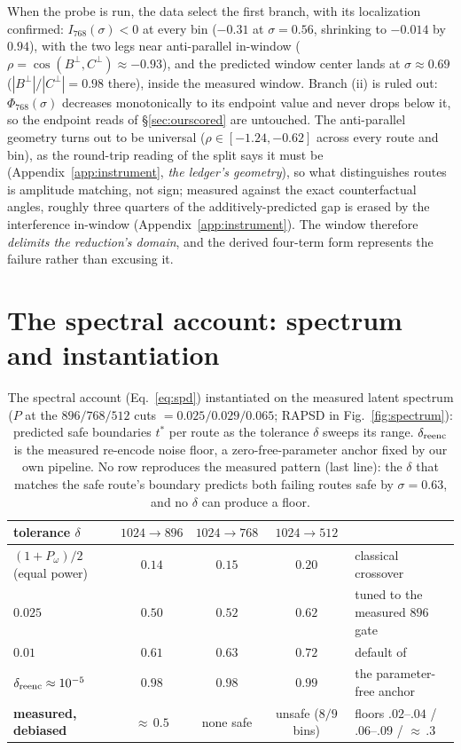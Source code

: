 When the probe is run, the data select the first branch, with its
localization confirmed:
$I_{768}(\sigma) < 0$ at every bin ($-0.31$ at $\sigma = 0.56$,
shrinking to $-0.014$ by $0.94$), with the two legs near anti-parallel
in-window ($\rho = \cos(B^{\perp}, C^{\perp}) \approx -0.93$), and the
predicted window center lands at $\sigma \approx 0.69$
($|B^{\perp}|/|C^{\perp}| = 0.98$ there), inside the measured
window. Branch (ii) is ruled out: $\Phi_{768}(\sigma)$ decreases
monotonically to its endpoint value and never drops below it, so the
endpoint reads of \S\ref{sec:ourscored} are untouched. The
anti-parallel geometry turns out to be universal
($\rho \in [-1.24, -0.62]$ across every route and bin), as the
round-trip reading of the split says it must be
(Appendix~\ref{app:instrument}, \emph{the ledger's geometry}), so what
distinguishes routes is amplitude matching, not sign; measured against
the exact counterfactual angles, roughly three quarters of the
additively-predicted gap is erased by the interference in-window
(Appendix~\ref{app:instrument}). The window therefore \emph{delimits
the reduction's domain}, and the derived four-term form represents the
failure rather than excusing it.

\section{The spectral account: spectrum and instantiation}
\label{app:spectral}

\begin{table}[t]
\caption{The spectral account (Eq.~\ref{eq:spd}) instantiated on the
measured latent spectrum ($P$ at the $896/768/512$ cuts
$= 0.025/0.029/0.065$; RAPSD in Fig.~\ref{fig:spectrum}):
predicted safe boundaries $t^{*}$ per route as the tolerance $\delta$
sweeps its range. $\delta_{\mathrm{reenc}}$ is the measured re-encode noise
floor, a zero-free-parameter anchor fixed by our own pipeline. No row
reproduces the measured pattern (last line): the $\delta$ that matches
the safe route's boundary predicts both failing routes safe by
$\sigma = 0.63$, and no $\delta$ can produce a floor.}
\label{tab:null}
\centering
\small
\setlength{\tabcolsep}{4pt}
\begin{tabular}{lcccl}
\toprule
tolerance $\delta$ & $1024{\to}896$ & $1024{\to}768$ & $1024{\to}512$ & \\
\midrule
$(1+P_\omega)/2$ (equal power) & $0.14$ & $0.15$ & $0.20$ & classical crossover \\
$0.025$ & $0.50$ & $0.52$ & $0.62$ & tuned to the measured $896$ gate \\
$0.01$ & $0.61$ & $0.63$ & $0.72$ & default of \citet{xiao2026spd} \\
$\delta_{\mathrm{reenc}} \approx 10^{-5}$ & $0.98$ & $0.98$ & $0.99$ & the parameter-free anchor \\
\midrule
\textbf{measured, debiased} & ${\approx}\,0.5$ &
none safe & unsafe ($8/9$ bins) & floors $.02$--$.04$ / $.06$--$.09$ / ${\approx}\,.3$ \\
\bottomrule
\end{tabular}
\end{table}


